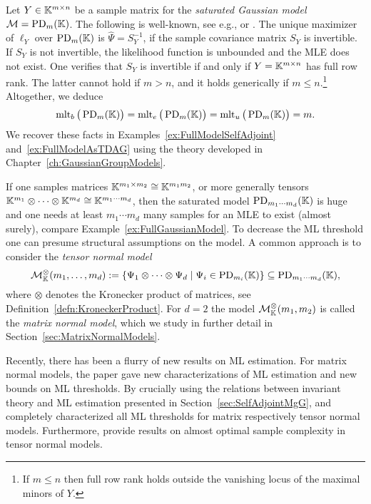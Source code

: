 \begin{example} \label{ex:FullGaussianModel}
	Let $Y \in \mathbb K^{m \times n}$ be a sample matrix for the \emph{saturated Gaussian model} $\mathcal{M} = \operatorname{PD}_m(\mathbb K)$.
	The following is well-known, see e.g., \cite[Theorem~5.1]{LauritzenBook} or \cite[Proposition~5.3.7]{SullivantBook}. The unique maximizer of $\ell_Y$ over $\operatorname{PD}_m(\mathbb K)$ is $\hat{\Psi} = S_Y^{-1}$, if the sample covariance matrix $S_Y$ is invertible. If $S_Y$ is not invertible, the likelihood function is unbounded and the MLE does not exist.
	One verifies that $S_Y$ is invertible if and only if $Y = \mathbb K^{m \times n}$ has full row rank. The latter cannot hold if $m > n$, and it holds generically	if $m \leq n$.\footnote{If $m \leq n$ then full row rank holds outside the vanishing locus of the maximal minors of $Y$.}
	Altogether, we deduce
		\[ \operatorname{mlt}_b \big( \operatorname{PD}_m(\mathbb K) \big) = \operatorname{mlt}_e \big( \operatorname{PD}_m(\mathbb K) \big) = \operatorname{mlt}_u \big( \operatorname{PD}_m(\mathbb K) \big) = m . \]
	We recover these facts in Examples~\ref{ex:FullModelSelfAdjoint} and~\ref{ex:FullModelAsTDAG} using the theory developed in Chapter~\ref{ch:GaussianGroupModels}.
	\hfill\exSymbol
\end{example}

\begin{example} \label{ex:MatrixTensorNormalModel}
	If one samples matrices $\mathbb K^{m_1 \times m_2} \cong \mathbb K^{m_1 m_2}$, or more generally tensors $\mathbb K^{m_1} \otimes \cdots \otimes \mathbb K^{m_d} \cong \mathbb K^{m_1 \cdots m_d}$, then the saturated model $\operatorname{PD}_{m_1 \cdots m_d}(\mathbb K)$ is huge and one needs at least $m_1 \cdots m_d$ many samples for an MLE to exist (almost surely), compare Example~\ref{ex:FullGaussianModel}.
	To decrease the ML threshold one can presume structural assumptions on the model. A common approach is to consider the \emph{tensor normal model}
	\begin{equation}\label{eq:TensorNormalModel}
		\mathcal{M}^{\otimes}_{\mathbb{K}}(m_1, \ldots, m_d) := \left\lbrace \Psi_1 \otimes \cdots \otimes \Psi_d \mid \Psi_i \in \operatorname{PD}_{m_i}(\mathbb K) \right\rbrace \subseteq \operatorname{PD}_{m_1 \cdots m_d}(\mathbb K),
	\end{equation}
	where $\otimes$ denotes the Kronecker product of matrices, see Definition~\ref{defn:KroneckerProduct}.
	For $d=2$ the model $\mathcal{M}^{\otimes}_{\mathbb{K}}(m_1, m_2)$ is called the \emph{matrix normal model}, which we study in further detail in Section~\ref{sec:MatrixNormalModels}.
	
	Recently, there has been a flurry of new results on ML estimation. For matrix normal models, the paper \cite{DrtonKurikiHoff} gave new characterizations of ML estimation and new bounds on ML thresholds. By crucially using the relations between invariant theory and ML estimation presented in Section~\ref{sec:SelfAdjointMgG}, \cite{DM21MatrixNormal} and \cite{DMW22TensorNormal} completely characterized all ML thresholds for matrix respectively tensor normal models. Furthermore, \cite{OptimalSampleComplexity} provide results on almost optimal sample complexity in tensor normal models.
	\hfill\exSymbol
\end{example}

